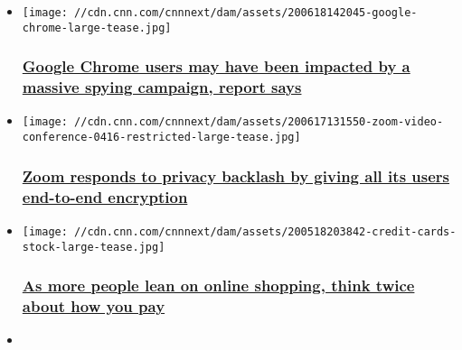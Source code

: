\begin{itemize}
\item
  \href{/2020/06/18/tech/google-chrome-extensions-spyware/index.html}{}

  \texttt{[image: //cdn.cnn.com/cnnnext/dam/assets/200618142045-google-chrome-large-tease.jpg]}

  \hypertarget{google-chrome-users-may-have-been-impacted-by-a-massive-spying-campaign-report-says}{%
  \subsubsection{\texorpdfstring{\href{/2020/06/18/tech/google-chrome-extensions-spyware/index.html}{Google
  Chrome users may have been impacted by a massive spying campaign,
  report
  says}}{Google Chrome users may have been impacted by a massive spying campaign, report says}}\label{google-chrome-users-may-have-been-impacted-by-a-massive-spying-campaign-report-says}}
\item
  \href{/2020/06/18/tech/zoom-end-to-end-encryption-video/index.html}{}

  \texttt{[image: //cdn.cnn.com/cnnnext/dam/assets/200617131550-zoom-video-conference-0416-restricted-large-tease.jpg]}

  \hypertarget{zoom-responds-to-privacy-backlash-by-giving-all-its-users-end-to-end-encryption}{%
  \subsubsection{\texorpdfstring{\href{/2020/06/18/tech/zoom-end-to-end-encryption-video/index.html}{Zoom
  responds to privacy backlash by giving all its users end-to-end
  encryption}}{Zoom responds to privacy backlash by giving all its users end-to-end encryption}}\label{zoom-responds-to-privacy-backlash-by-giving-all-its-users-end-to-end-encryption}}
\item
  \href{/2020/06/18/tech/cybersecurity-online-shopping/index.html}{}

  \texttt{[image: //cdn.cnn.com/cnnnext/dam/assets/200518203842-credit-cards-stock-large-tease.jpg]}

  \hypertarget{as-more-people-lean-on-online-shopping-think-twice-about-how-you-pay}{%
  \subsubsection{\texorpdfstring{\href{/2020/06/18/tech/cybersecurity-online-shopping/index.html}{As
  more people lean on online shopping, think twice about how you
  pay}}{As more people lean on online shopping, think twice about how you pay}}\label{as-more-people-lean-on-online-shopping-think-twice-about-how-you-pay}}
\item
  \href{/2020/06/09/tech/nintendo-300000-accounts-hacked/index.html}{}


\end{itemize}
